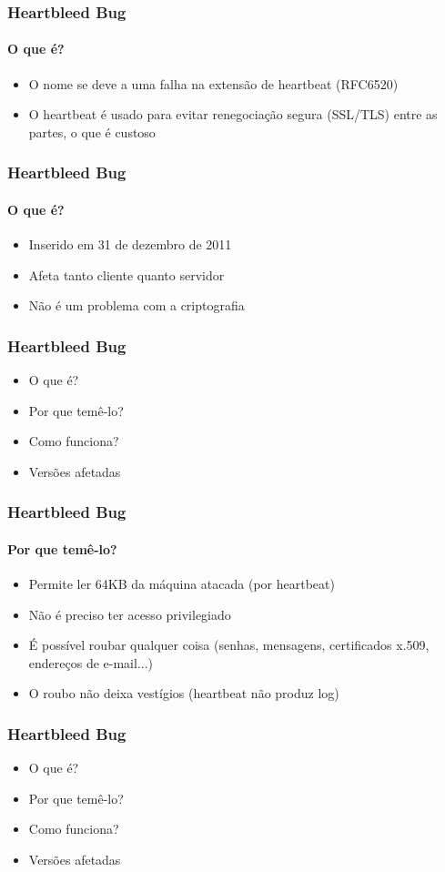 \documentclass{beamer}
\begin{document}
\begin{frame}
	\frametitle{Heartbleed Bug}
	\framesubtitle{O que é?}
	\begin{itemize}
		\item O nome se deve a uma falha na extensão de heartbeat (RFC6520)
		\item O heartbeat é usado para evitar renegociação segura (SSL/TLS) entre as partes, o que é custoso
	\end{itemize}
\end{frame}

\begin{frame}
	\frametitle{Heartbleed Bug}
	\framesubtitle{O que é?}
	\begin{itemize}
		\item Inserido em 31 de dezembro de 2011
		\item Afeta tanto cliente quanto servidor
		\item Não é um problema com a criptografia
	\end{itemize}
\end{frame}

\begin{frame}
	\frametitle{Heartbleed Bug}
	\begin{itemize}
		\item \textcolor{covered}{O que é?}
		\item Por que temê-lo?
		\item Como funciona?
		\item Versões afetadas
	\end{itemize}
\end{frame}

\begin{frame}
	\frametitle{Heartbleed Bug}
	\framesubtitle{Por que temê-lo?}
	\begin{itemize}
		\item Permite ler 64KB da máquina atacada (por heartbeat)
		\item Não é preciso ter acesso privilegiado
		\item É possível roubar qualquer coisa (senhas, mensagens, certificados x.509, endereços de e-mail...)
		\item O roubo não deixa vestígios (heartbeat não produz log)
	\end{itemize}
\end{frame}

\begin{frame}
	\frametitle{Heartbleed Bug}
	\begin{itemize}
		\item \textcolor{covered}{O que é?}
		\item \textcolor{covered}{Por que temê-lo?}
		\item Como funciona?
		\item Versões afetadas
	\end{itemize}
\end{frame}
\end{document}

